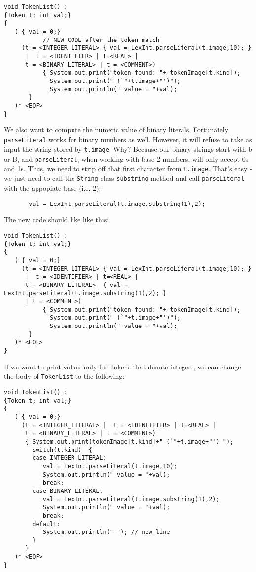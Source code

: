 \documentclass{article}
\begin{document}
\begin{verbatim}
void TokenList() :
{Token t; int val;}
{
   ( { val = 0;}
           // NEW CODE after the token match
     (t = <INTEGER_LITERAL> { val = LexInt.parseLiteral(t.image,10); }
      |  t = <IDENTIFIER> | t=<REAL> |
      t = <BINARY_LITERAL> | t = <COMMENT>)
           { System.out.print("token found: "+ tokenImage[t.kind]);
             System.out.print(" (`"+t.image+"')"); 
             System.out.println(" value = "+val); 
	   }
   )* <EOF>
}
\end{verbatim}

We also want to compute the numeric value of binary literals. Fortunately {\tt parseLiteral} works for binary numbers as well. However, it will refuse to take as input the string stored by \verb+t.image+. Why? Because our binary strings start with b or B, and {\tt parseLiteral}, when working with base 2 numbers, will only accept 0s and 1s. Thus, we need to strip off that first character from \verb+t.image+. That's easy - we just need to call the {\tt String} class {\tt substring} method and call {\tt parseLiteral} with the appopiate base (i.e. 2):

\begin{verbatim}
       val = LexInt.parseLiteral(t.image.substring(1),2);
\end{verbatim}

The new code should like like this:

\begin{verbatim}
void TokenList() :
{Token t; int val;}
{
   ( { val = 0;}
     (t = <INTEGER_LITERAL> { val = LexInt.parseLiteral(t.image,10); }
      |  t = <IDENTIFIER> | t=<REAL> |
      t = <BINARY_LITERAL>  { val = LexInt.parseLiteral(t.image.substring(1),2); }
      | t = <COMMENT>)
           { System.out.print("token found: "+ tokenImage[t.kind]);
             System.out.print(" (`"+t.image+"')"); 
             System.out.println(" value = "+val); 
	   }
   )* <EOF>
}
\end{verbatim}

If we want to print values only for Tokens that denote integers, we can change the body of {\tt TokenList} to the following:

\begin{verbatim}
void TokenList() :
{Token t; int val;}
{
   ( { val = 0;}
     (t = <INTEGER_LITERAL> |  t = <IDENTIFIER> | t=<REAL> |
      t = <BINARY_LITERAL> | t = <COMMENT>)
      { System.out.print(tokenImage[t.kind]+" (`"+t.image+"') "); 
        switch(t.kind)  {   
        case INTEGER_LITERAL:
           val = LexInt.parseLiteral(t.image,10);
           System.out.println(" value = "+val);  
           break;
        case BINARY_LITERAL:
           val = LexInt.parseLiteral(t.image.substring(1),2);
           System.out.println(" value = "+val); 
           break;
        default:
           System.out.println(" "); // new line
        }  
      }
   )* <EOF>
}
\end{verbatim}
\end{document}
